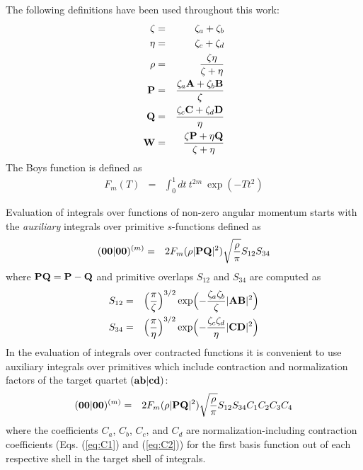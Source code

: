 \documentclass[10pt]{article}
\begin{document}
The following definitions have been used throughout this work:
\begin{eqnarray}
\zeta & = & \zeta_a + \zeta_b \\
\eta  & = & \zeta_c + \zeta_d \\
\rho  & = & \frac{\zeta\eta}{\zeta+\eta} \\
{\bf P}& = & \frac{\zeta_a {\bf A} + \zeta_b {\bf B}}{\zeta} \\
{\bf Q}& = & \frac{\zeta_c {\bf C} + \zeta_d {\bf D}}{\eta} \\
{\bf W}& = & \frac{\zeta {\bf P} + \eta {\bf Q}}{\zeta+\eta}
\end{eqnarray}
The Boys function is defined as
\begin{eqnarray}
F_m(T) & = & \int_0^{1} dt\ t^{2m}\ \exp (-Tt^2)
\end{eqnarray}

Evaluation of integrals over functions of non-zero angular momentum starts with the
{\em auxiliary} integrals over primitive $s$-functions
defined as
\begin{eqnarray}
\label{eq:0000m}
({\bf 00}|{\bf 00})^{(m)} & = & 2 F_m(\rho |{\bf PQ}|^2) \sqrt{\frac{\rho}{\pi}}S_{12}S_{34}
\end{eqnarray}
where ${\bf PQ} = {\bf P} - {\bf Q}$ and primitive overlaps $S_{12}$ and $S_{34}$
are computed as
\begin{eqnarray}
S_{12} & = & \Bigl( \frac{\pi}{\zeta} \Bigr)^{3/2}
\exp \Bigl(-\frac{\zeta_a\zeta_b}{\zeta} |{\bf AB}|^2 \Bigr) \\
S_{34} & = & \Bigl( \frac{\pi}{\eta} \Bigr)^{3/2}
\exp \Bigl(-\frac{\zeta_c\zeta_d}{\eta} |{\bf CD}|^2 \Bigr)
\end{eqnarray}
In the evaluation of integrals over contracted functions it is convenient to
use auxiliary integrals over primitives which include contraction and normalization factors of the
target quartet $({\bf ab}|{\bf cd})$:
\begin{eqnarray} \label{eq:0000m_scaled}
({\bf 00}|{\bf 00})^{(m)} & = &  2 F_m(\rho |{\bf PQ}|^2) \sqrt{\frac{\rho}{\pi}}S_{12}S_{34}
C_1 C_2 C_3 C_4
\end{eqnarray}
where the coefficients $C_a$, $C_b$, $C_c$, and $C_d$ are
normalization-including contraction coefficients (Eqs. (\ref{eq:C1})
and (\ref{eq:C2})) for the first basis function out of each respective shell
in the target shell of integrals.



\end{document}
